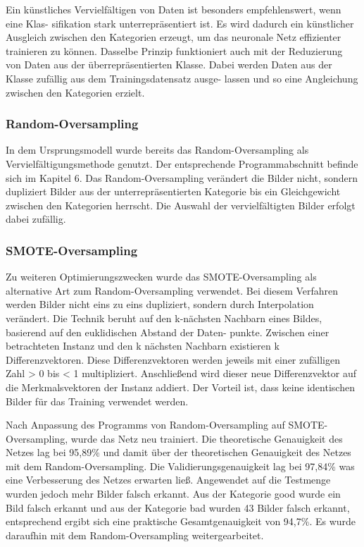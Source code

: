 Ein künstliches Vervielfältigen von Daten ist besonders empfehlenswert, wenn eine Klas-
sifikation stark unterrepräsentiert ist. Es wird dadurch ein künstlicher Ausgleich zwischen
den Kategorien erzeugt, um das neuronale Netz effizienter trainieren zu können. Dasselbe
Prinzip funktioniert auch mit der Reduzierung von Daten aus der überrepräsentierten
Klasse. Dabei werden Daten aus der Klasse zufällig aus dem Trainingsdatensatz ausge-
lassen und so eine Angleichung zwischen den Kategorien erzielt.

\subsubsection{Random-Oversampling}

In dem Ursprungsmodell wurde bereits das Random-Oversampling als Vervielfältigungsmethode
genutzt. Der entsprechende Programmabschnitt befinde sich im Kapitel 6.
Das Random-Oversampling verändert die Bilder nicht, sondern dupliziert Bilder aus der
unterrepräsentierten Kategorie bis ein Gleichgewicht zwischen den Kategorien herrscht.
Die Auswahl der vervielfältigten Bilder erfolgt dabei zufällig. \cite{Lemaitre:2017}

\subsubsection{SMOTE-Oversampling}
Zu weiteren Optimierungszwecken wurde das SMOTE-Oversampling als alternative Art
zum Random-Oversampling verwendet. Bei diesem Verfahren werden Bilder nicht eins
zu eins dupliziert, sondern durch Interpolation verändert. Die Technik beruht auf den
k-nächsten Nachbarn eines Bildes, basierend auf den euklidischen Abstand der Daten-
punkte. Zwischen einer betrachteten Instanz und den k nächsten Nachbarn existieren k
Differenzvektoren. Diese Differenzvektoren werden jeweils mit einer zufälligen Zahl > 0
bis < 1 multipliziert. Anschließend wird dieser neue Differenzvektor auf die 
Merkmalsvektoren der Instanz addiert. Der Vorteil ist, dass keine identischen Bilder 
für das Training verwendet werden. \cite{Chakrabarty:2015}

Nach Anpassung des Programms von Random-Oversampling auf SMOTE-Oversampling,
wurde das Netz neu trainiert. Die theoretische Genauigkeit des Netzes lag bei 95,89\% und
damit über der theoretischen Genauigkeit des Netzes mit dem Random-Oversampling.
Die Validierungsgenauigkeit lag bei 97,84\% was eine Verbesserung des Netzes erwarten
ließ. Angewendet auf die Testmenge wurden jedoch mehr Bilder falsch erkannt. Aus der
Kategorie good wurde ein Bild falsch erkannt und aus der Kategorie bad wurden 43 Bilder
falsch erkannt, entsprechend ergibt sich eine praktische Gesamtgenauigkeit von 94,7\%. Es
wurde daraufhin mit dem Random-Oversampling weitergearbeitet.

